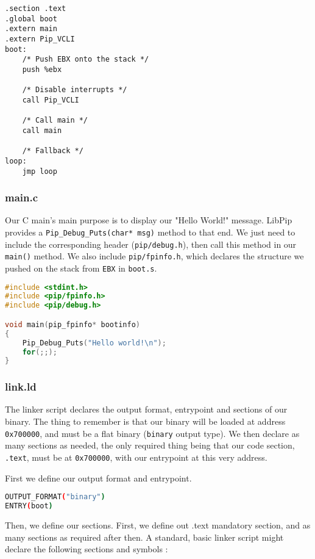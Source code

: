 \documentclass[10pt,a4paper,titlepage]{refart}
\begin{document}
\begin{lstlisting}[language={[x86masm]Assembler},caption={boot.s}]
.section .text
.global boot
.extern main
.extern Pip_VCLI
boot:
    /* Push EBX onto the stack */
    push %ebx

    /* Disable interrupts */
    call Pip_VCLI

    /* Call main */
    call main
    
    /* Fallback */
loop:
    jmp loop
\end{lstlisting}
\subsubsection{main.c}
Our C main's main purpose is to display our "Hello World!" message. LibPip provides a \texttt{Pip\_Debug\_Puts(char* msg)} method to that end. We just need to include the corresponding header (\texttt{pip/debug.h}), then call this method in our \texttt{main()} method. We also include \texttt{pip/fpinfo.h}, which declares the structure we pushed on the stack from \texttt{EBX} in \texttt{boot.s}.

\begin{lstlisting}[language=C,caption={main.c}]
#include <stdint.h>
#include <pip/fpinfo.h>
#include <pip/debug.h>

void main(pip_fpinfo* bootinfo)
{
	Pip_Debug_Puts("Hello world!\n");
	for(;;);
}
\end{lstlisting}
\subsubsection{link.ld}
The linker script declares the output format, entrypoint and sections of our binary. The thing to remember is that our binary will be loaded at address \texttt{0x700000}, and must be a flat binary (\texttt{binary} output type). We then declare as many sections as needed, the only required thing being that our code section, \texttt{.text}, must be at \texttt{0x700000}, with our entrypoint at this very address.

First we define our output format and entrypoint.

\begin{lstlisting}[language=bash,caption={link.ld output and entrypoint}]
OUTPUT_FORMAT("binary")
ENTRY(boot)
\end{lstlisting}

Then, we define our sections. First, we define out .text mandatory section, and as many sections as required after then. A standard, basic linker script might declare the following sections and symbols :
\end{document}
